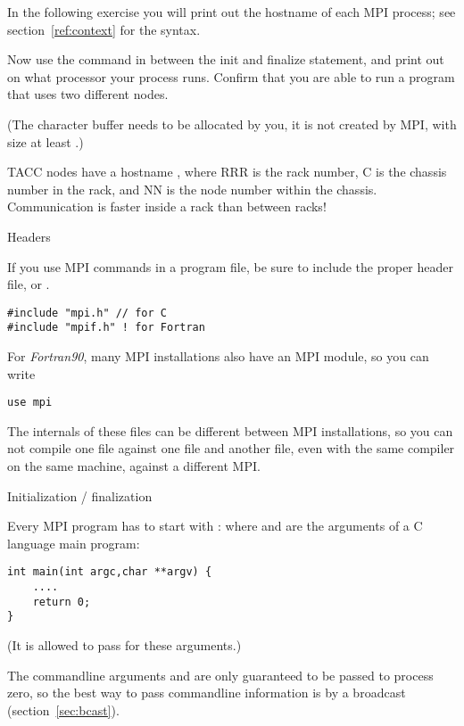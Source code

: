 In the following exercise you will print out the hostname
of each MPI process; see section~\ref{ref:context} for the syntax.
\begin{exercise}
  \label{ex:procname}
  Now use the command 
  in between the
  init and finalize statement, and print out on what processor your process runs.
  Confirm that you are able to run a program that uses two different nodes.

  (The character buffer needs to be allocated by you, it is not
  created by MPI, with size at
  least .)
\begin{tacc}
TACC nodes have a hostname , where RRR is the rack number, C is the chassis
number in the rack, and NN is the node number within the chassis. Communication
is faster inside a rack than between racks!
\end{tacc}
\end{exercise}

 {Headers}

If you use MPI commands in a program file, be sure to include
the proper header file,  or .
\begin{verbatim}
#include "mpi.h" // for C
#include "mpif.h" ! for Fortran
\end{verbatim}
For \emph{Fortran90}, many MPI installations
also have an MPI module, so you can write
\begin{verbatim}
use mpi
\end{verbatim}
The internals of these files can be different between MPI
installations, so you can not compile one file against one 
file and another file, even with the same compiler on the same machine,
against a different MPI.

 {Initialization / finalization}
\label{sec:mpi-init}

Every MPI program has to start with :
%
%
where  and  are the arguments
of a C language main program:
\begin{verbatim}
int main(int argc,char **argv) {
    ....
    return 0;
}
\end{verbatim}
(It is allowed to pass  for these arguments.)

The commandline arguments  and  are only guaranteed to
be passed to process zero, so the best way to pass commandline information
is by a broadcast (section~\ref{sec:bcast}).

